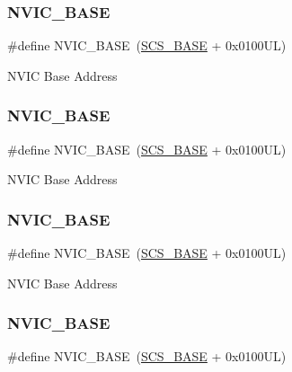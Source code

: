 \subsubsection{\texorpdfstring{NVIC\_BASE}{NVIC\_BASE}\hspace{0.1cm}{\footnotesize\ttfamily [9/12]}}
{\footnotesize\ttfamily \#define N\+V\+I\+C\+\_\+\+B\+A\+SE~(\mbox{\hyperlink{group___c_m_s_i_s__core__base_ga3c14ed93192c8d9143322bbf77ebf770}{S\+C\+S\+\_\+\+B\+A\+SE}} +  0x0100\+U\+L)}

N\+V\+IC Base Address \mbox{\label{group___c_m_s_i_s__core__base_gaa0288691785a5f868238e0468b39523d}} 
\subsubsection{\texorpdfstring{NVIC\_BASE}{NVIC\_BASE}\hspace{0.1cm}{\footnotesize\ttfamily [10/12]}}
{\footnotesize\ttfamily \#define N\+V\+I\+C\+\_\+\+B\+A\+SE~(\mbox{\hyperlink{group___c_m_s_i_s__core__base_ga3c14ed93192c8d9143322bbf77ebf770}{S\+C\+S\+\_\+\+B\+A\+SE}} +  0x0100\+U\+L)}

N\+V\+IC Base Address \mbox{\label{group___c_m_s_i_s__core__base_gaa0288691785a5f868238e0468b39523d}} 
\subsubsection{\texorpdfstring{NVIC\_BASE}{NVIC\_BASE}\hspace{0.1cm}{\footnotesize\ttfamily [11/12]}}
{\footnotesize\ttfamily \#define N\+V\+I\+C\+\_\+\+B\+A\+SE~(\mbox{\hyperlink{group___c_m_s_i_s__core__base_ga3c14ed93192c8d9143322bbf77ebf770}{S\+C\+S\+\_\+\+B\+A\+SE}} +  0x0100\+U\+L)}

N\+V\+IC Base Address \mbox{\label{group___c_m_s_i_s__core__base_gaa0288691785a5f868238e0468b39523d}} 
\subsubsection{\texorpdfstring{NVIC\_BASE}{NVIC\_BASE}\hspace{0.1cm}{\footnotesize\ttfamily [12/12]}}
{\footnotesize\ttfamily \#define N\+V\+I\+C\+\_\+\+B\+A\+SE~(\mbox{\hyperlink{group___c_m_s_i_s__core__base_ga3c14ed93192c8d9143322bbf77ebf770}{S\+C\+S\+\_\+\+B\+A\+SE}} +  0x0100\+U\+L)}

